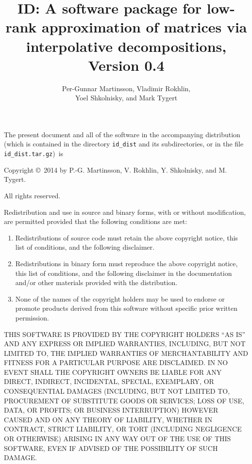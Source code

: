\documentclass[letterpaper,12pt]{article}
\title{ID: A software package for low-rank approximation
       of matrices via interpolative decompositions, Version 0.4}
\author{Per-Gunnar Martinsson, Vladimir Rokhlin,\\
        Yoel Shkolnisky, and Mark Tygert}
\begin{document}
\maketitle

\newpage

{\parindent=0pt

The present document and all of the software
in the accompanying distribution (which is contained in the directory
{\tt id\_dist} and its subdirectories, or in the file
{\tt id\_dist.tar.gz})\, is

\bigskip

Copyright \copyright\ 2014 by P.-G. Martinsson, V. Rokhlin,
Y. Shkolnisky, and M. Tygert.

\bigskip

All rights reserved.

\bigskip

Redistribution and use in source and binary forms, with or without
modification, are permitted provided that the following conditions are
met:

\begin{enumerate}
\item Redistributions of source code must retain the above copyright
notice, this list of conditions, and the following disclaimer.
\item Redistributions in binary form must reproduce the above copyright
notice, this list of conditions, and the following disclaimer in the
documentation and/or other materials provided with the distribution.
\item None of the names of the copyright holders may be used to endorse
or promote products derived from this software without specific prior
written permission.
\end{enumerate}

\bigskip

THIS SOFTWARE IS PROVIDED BY THE COPYRIGHT HOLDERS ``AS IS'' AND ANY
EXPRESS OR IMPLIED WARRANTIES, INCLUDING, BUT NOT LIMITED TO, THE
IMPLIED WARRANTIES OF MERCHANTABILITY AND FITNESS FOR A PARTICULAR
PURPOSE ARE DISCLAIMED. IN NO EVENT SHALL THE COPYRIGHT OWNERS BE
LIABLE FOR ANY DIRECT, INDIRECT, INCIDENTAL, SPECIAL, EXEMPLARY, OR
CONSEQUENTIAL DAMAGES (INCLUDING, BUT NOT LIMITED TO, PROCUREMENT OF
SUBSTITUTE GOODS OR SERVICES; LOSS OF USE, DATA, OR PROFITS; OR
BUSINESS INTERRUPTION) HOWEVER CAUSED AND ON ANY THEORY OF LIABILITY,
WHETHER IN CONTRACT, STRICT LIABILITY, OR TORT (INCLUDING NEGLIGENCE OR
OTHERWISE) ARISING IN ANY WAY OUT OF THE USE OF THIS SOFTWARE, EVEN IF
ADVISED OF THE POSSIBILITY OF SUCH DAMAGE.

}
\end{document}
